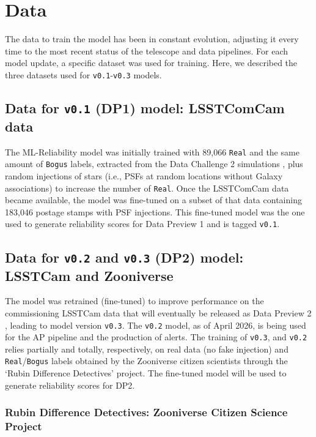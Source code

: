 \documentclass[DM,authoryear,toc]{lsstdoc}
\newcommand{\V}[1]{{\texttt{v0.#1}}}
\begin{document}
\section{Data}\label{sec:data}

The data to train the model has been in constant evolution, adjusting it every time to the most recent status of the telescope and data pipelines. For each model update, a specific dataset was used for training. Here, we described the three datasets used for \V1-\V3 models.

\subsection{Data for \V1 (DP1) model: LSSTComCam data}

The ML-Reliability model was initially trained with 89,066 \texttt{Real} and the same amount of \texttt{Bogus} labels, extracted from the Data Challenge 2 simulations \cite[DC2,][]{2021arXiv210104855L}, plus random injections of stars (i.e., PSFs at random locations without Galaxy associations) to increase the number of \texttt{Real}. Once the LSSTComCam data became available, the model was fine-tuned on a subset of that data containing 183,046 postage stamps with PSF injections. This fine-tuned model was the one used to generate reliability scores for Data Preview 1 \cite[DP1,][]{RTN-095} and is tagged \V1. 

\subsection{Data for \V2 and \V3 (DP2) model: LSSTCam and Zooniverse}

The model was retrained (fine-tuned) to improve performance on the commissioning LSSTCam data that will eventually be released as Data Preview 2 \cite[DP2][]{RTN-111}, leading to model version \V3. The \V2 model, as of April 2026, is being used for the AP pipeline and the production of alerts. The training of \V3, and \V2 relies partially and totally, respectively, on real data (no fake injection) and \texttt{Real}/\texttt{Bogus} labels obtained by the Zooniverse citizen scientists through the `Rubin Difference Detectives' project. The fine-tuned model will be used to generate reliability scores for DP2.
 
\subsubsection{Rubin Difference Detectives: Zooniverse Citizen Science Project}\label{sec:zooniverse}
\end{document}
